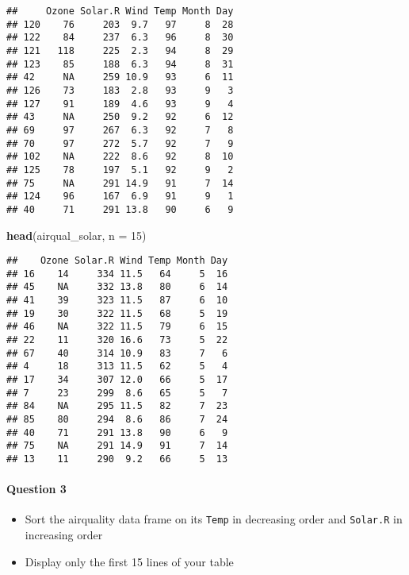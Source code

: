 \documentclass[
]{article}
\newenvironment{Shaded}{\begin{snugshade}}{\end{snugshade}}
\newcommand{\DataTypeTok}[1]{\textcolor[rgb]{0.13,0.29,0.53}{#1}}
\newcommand{\DecValTok}[1]{\textcolor[rgb]{0.00,0.00,0.81}{#1}}
\newcommand{\KeywordTok}[1]{\textcolor[rgb]{0.13,0.29,0.53}{\textbf{#1}}}
\newcommand{\NormalTok}[1]{#1}
\providecommand{\tightlist}{%
  \setlength{\itemsep}{0pt}\setlength{\parskip}{0pt}}
\begin{document}
\begin{verbatim}
##     Ozone Solar.R Wind Temp Month Day
## 120    76     203  9.7   97     8  28
## 122    84     237  6.3   96     8  30
## 121   118     225  2.3   94     8  29
## 123    85     188  6.3   94     8  31
## 42     NA     259 10.9   93     6  11
## 126    73     183  2.8   93     9   3
## 127    91     189  4.6   93     9   4
## 43     NA     250  9.2   92     6  12
## 69     97     267  6.3   92     7   8
## 70     97     272  5.7   92     7   9
## 102    NA     222  8.6   92     8  10
## 125    78     197  5.1   92     9   2
## 75     NA     291 14.9   91     7  14
## 124    96     167  6.9   91     9   1
## 40     71     291 13.8   90     6   9
\end{verbatim}

\begin{Shaded}
\begin{Highlighting}[]
\KeywordTok{head}\NormalTok{(airqual_solar, }\DataTypeTok{n =} \DecValTok{15}\NormalTok{)}
\end{Highlighting}
\end{Shaded}

\begin{verbatim}
##    Ozone Solar.R Wind Temp Month Day
## 16    14     334 11.5   64     5  16
## 45    NA     332 13.8   80     6  14
## 41    39     323 11.5   87     6  10
## 19    30     322 11.5   68     5  19
## 46    NA     322 11.5   79     6  15
## 22    11     320 16.6   73     5  22
## 67    40     314 10.9   83     7   6
## 4     18     313 11.5   62     5   4
## 17    34     307 12.0   66     5  17
## 7     23     299  8.6   65     5   7
## 84    NA     295 11.5   82     7  23
## 85    80     294  8.6   86     7  24
## 40    71     291 13.8   90     6   9
## 75    NA     291 14.9   91     7  14
## 13    11     290  9.2   66     5  13
\end{verbatim}

\hypertarget{question-3}{%
\paragraph{Question 3}\label{question-3}}

\begin{itemize}
\tightlist
\item
  Sort the airquality data frame on its \texttt{Temp} in decreasing
  order and \texttt{Solar.R} in increasing order
\item
  Display only the first 15 lines of your table
\end{itemize}
\end{document}
